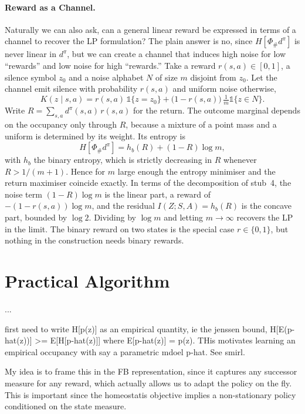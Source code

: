 \documentclass[11pt]{article}
\theoremstyle{remark}
\newcommand{\1}{\mathds{1}}
\newcommand{\occ}{d^{\pi}}
\newcommand{\push}{\Phi_{\#}}
\newcommand{\Hf}[1]{H\!\left[#1\right]}
\begin{document}
\paragraph{Reward as a Channel.}
Naturally we can also ask, can a general linear reward be expressed in terms of a channel to recover the LP formulation?
The plain answer is no, since $\Hf{\push\occ}$ is never linear in $\occ$, but we can create a channel that induces high noise for low ``rewards'' and low noise for high ``rewards.''
Take a reward $r(s,a)\in[0,1]$, a silence symbol $z_0$ and a noise alphabet $N$ of size $m$ disjoint from $z_0$.
Let the channel emit silence with probability $r(s,a)$ and uniform noise otherwise,
\begin{equation}
  K(z\mid s,a)=r(s,a)\,\1\{z=z_0\}+\big(1-r(s,a)\big)\,\tfrac{1}{m}\1\{z\in N\}.
  \label{eq:reward-channel}
\end{equation}
Write $R=\sum_{s,a}\occ(s,a)\,r(s,a)$ for the return.
The outcome marginal depends on the occupancy only through $R$, because a mixture of a point mass and a uniform is determined by its weight.
Its entropy is
\begin{equation}
  \Hf{\push\occ}=h_b(R)+(1-R)\log m,
  \label{eq:reward-channel-entropy}
\end{equation}
with $h_b$ the binary entropy, which is strictly decreasing in $R$ whenever $R>1/(m+1)$.
Hence for $m$ large enough the entropy minimiser and the return maximiser coincide exactly.
In terms of the decomposition of stub~4, the noise term $(1-R)\log m$ is the linear part, a reward of $-(1-r(s,a))\log m$, and the residual $I(Z;S,A)=h_b(R)$ is the concave part, bounded by $\log 2$.
Dividing by $\log m$ and letting $m\to\infty$ recovers the LP in the limit.
The binary reward on two states is the special case $r\in\{0,1\}$, but nothing in the construction needs binary rewards.




\section{Practical Algorithm}
...

first need to write H[p(z)] as an empirical quantity, ie the jenssen bound, H[E(p-hat(z))] >= E[H[p-hat(z)]] where E[p-hat(z)] = p(z). THis motivates learning an empirical occupancy with say a parametric mdoel p-hat. See smirl.

My idea is to frame this in the FB representation, since it captures any successor measure for any reward, which actually allows us to adapt the policy on the fly. This is important since the homeostatis objective implies a non-stationary policy conditioned on the state measure.
\end{document}
